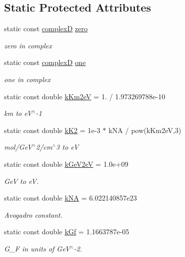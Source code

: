\subsection*{Static Protected Attributes}
\begin{DoxyCompactItemize}
\item 
static const \hyperlink{EigenPoint_8h_a67ca8e107e20610c3fff78d5e726ece0}{complexD} \hyperlink{classOscProb_1_1PMNS__Base_a05e595848c2521dc795efa7645728b94}{zero}
\begin{DoxyCompactList}\small\item\em zero in complex \end{DoxyCompactList}\item 
static const \hyperlink{EigenPoint_8h_a67ca8e107e20610c3fff78d5e726ece0}{complexD} \hyperlink{classOscProb_1_1PMNS__Base_a7d1d0bbcab30a1fd8c368c40134c51ff}{one}
\begin{DoxyCompactList}\small\item\em one in complex \end{DoxyCompactList}\item 
static const double \hyperlink{classOscProb_1_1PMNS__Base_a382ddd7b76ca89b43f22614a2ea7327b}{k\+Km2eV} = 1. / 1.\+973269788e-\/10
\begin{DoxyCompactList}\small\item\em km to e\+V$^\wedge$-\/1 \end{DoxyCompactList}\item 
static const double \hyperlink{classOscProb_1_1PMNS__Base_a326fc5016d7dd7ce05682c06cdcb6d94}{k\+K2} = 1e-\/3 $\ast$ k\+N\+A / pow(k\+Km2e\+V,3)
\begin{DoxyCompactList}\small\item\em mol/\+Ge\+V$^\wedge$2/cm$^\wedge$3 to eV \end{DoxyCompactList}\item 
static const double \hyperlink{classOscProb_1_1PMNS__Base_ad36a0a6bf58d6ec093d3947784bd89e9}{k\+Ge\+V2eV} = 1.\+0e+09
\begin{DoxyCompactList}\small\item\em GeV to eV. \end{DoxyCompactList}\item 
static const double \hyperlink{classOscProb_1_1PMNS__Base_a69355e770b89e99437c2b8a66e48eeb9}{k\+NA} = 6.\+022140857e23
\begin{DoxyCompactList}\small\item\em Avogadro constant. \end{DoxyCompactList}\item 
static const double \hyperlink{classOscProb_1_1PMNS__Base_a7f26a3456128234b2ae6cc9141a6532f}{k\+Gf} = 1.\+1663787e-\/05
\begin{DoxyCompactList}\small\item\em G\+\_\+F in units of Ge\+V$^\wedge$-\/2. \end{DoxyCompactList}\end{DoxyCompactItemize}


